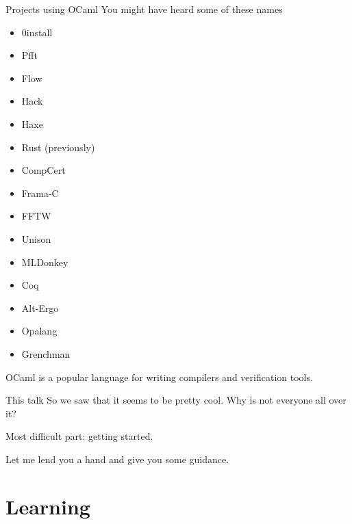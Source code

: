 \documentclass{beamer}
\begin{document}
\begin{frame}{Projects using OCaml}
  You might have heard some of these names
  \begin{multicols}{3}
  \begin{itemize}
    \item 0install
    \item Pfft
    \item Flow
    \item Hack
    \item Haxe
    \item Rust (previously)
    \item CompCert
    \item Frama-C
    \item FFTW
    \item Unison
    \item MLDonkey
    \item Coq
    \item Alt-Ergo
    \item Opalang
    \item Grenchman
  \end{itemize}
  \end{multicols}
  OCaml is a popular language for writing compilers and verification tools.
\end{frame}

\begin{frame}{This talk}
  So we saw that it seems to be pretty cool. Why is not everyone all over it?

  Most difficult part: getting started.

  Let me lend you a hand and give you some guidance.
\end{frame}

\section{Learning}
\end{document}
